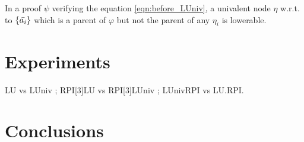 \documentclass{llncs}
\begin{document}
In a proof $\psi$ verifying the equation \ref{eqn:before_LUniv}, a univalent node $\eta$ w.r.t. to
$\{\bar{a_i}\}$ which is a parent of $\varphi$ but not the parent of any $\eta_i$ is lowerable.


\section{Experiments}

\begin{jb}
LU vs LUniv ; RPI[3]LU vs RPI[3]LUniv ; LUnivRPI vs LU.RPI.
\end{jb}

\section{Conclusions}



\end{document}
